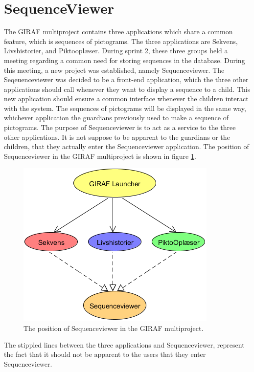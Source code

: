 \section{SequenceViewer}\label{sec:sequenceviewer}
The GIRAF multiproject contains three applications which share a common feature, which is sequences of pictograms. The three applications are Sekvens, Livshistorier, and Piktooplæser. During sprint 2, these three groups held a meeting regarding a common need for storing sequences in the database. During this meeting, a new project was established, namely Sequenceviewer. The Seqeuenceviewer was decided to be a front-end application, which the three other applications should call whenever they want to display a sequence to a child. This new application should ensure a common interface whenever the children interact with the system. The sequences of pictograms will be displayed in the same way, whichever application the guardians previously used to make a sequence of pictograms.
The purpose of Sequenceviewer is to act as a service to the three other applications. It is not suppose to be apparent to the guardians or the children, that they actually enter the Sequenceviewer application. The position of Sequenceviewer in the GIRAF multiproject is shown in figure \ref{fig:sequenceviewer}.
\begin{figure}[H]
	\centering
	\includegraphics[scale=0.8]{Pics/sequenceviewer}
	\caption{The position of Sequenceviewer in the GIRAF multiproject.}
	\label{fig:sequenceviewer}
\end{figure}
The stippled lines between the three applications and Sequenceviewer, represent the fact that it should not be apparent to the users that they enter Sequenceviewer.

